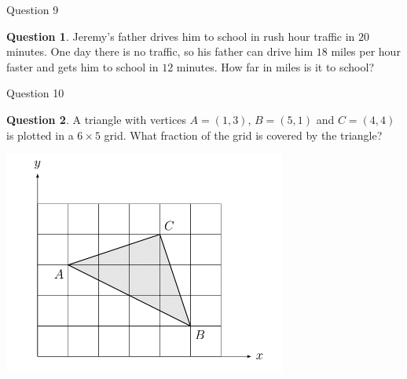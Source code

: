 \documentclass[handout]{beamer}
\theoremstyle{definition}
\newtheorem{quest}{Question}
\begin{document}
\begin{frame}{Question 9}
\begin{quest}
Jeremy's father drives him to school in rush hour traffic in $20$ minutes.  One day there is no traffic, so his father can drive him $18$ miles per hour faster and gets him to school in $12$ minutes.  How far in miles is it to school?
\end{quest}
\end{frame}

\begin{frame}{Question 10}
\begin{quest}
A triangle with vertices $A=(1,3)$, $B=(5,1)$ and $C=(4,4)$ is plotted in a $6\times 5$ grid.  What fraction of the grid is covered by the triangle?
\end{quest}
\begin{center}
\includegraphics[width=.5\linewidth]{fig/probset3fig1.png}
\end{center}
\end{frame}
\end{document}
